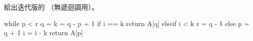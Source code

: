 \startEXERCISE
給出迭代版的  （無遞迴調用）。
\stopEXERCISE

\startANSWER
{}
\startCLRSCODE
while p < r
	q = 
	k = q - p + 1
	if i == k
		return A[q]
	elseif i < k
		r = q - 1
	else
		p = q + 1
		i = i - k
return A[p]
\stopCLRSCODE
\stopANSWER
